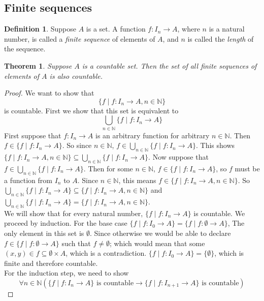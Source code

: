 \documentclass{report}
\newtheorem*{theorem}{Theorem}
\theoremstyle{definition}
\newtheorem*{definition}{Definition}
\begin{document}
\subsection{Finite sequences}
\begin{definition}
Suppose $A$ is a set. A function $f:I_n\to A$, where $n$ is a natural number, is called a \textit{finite sequence} of elements of $A$, and $n$ is called the \textit{length} of the sequence.
\end{definition}
\begin{theorem}
Suppose $A$ is a countable set. Then the set of all finite sequences of elements of $A$ is also countable.
\end{theorem}
\begin{proof}
We want to show that 
\begin{equation*}
\{f\mid f:I_n\to A,n\in\mathbb N\}
\end{equation*}
is countable. First we show that this set is equivalent to
\begin{equation*}
\bigcup_{n\in\mathbb N}\{f\mid f:I_n\to A\}
\end{equation*}
First suppose that $f:I_n\to A$ is an arbitrary function for arbitrary $n\in\mathbb N$. 
Then $f\in\{f\mid f:I_n\to A\}$. So since $n\in\mathbb N$, $f\in\bigcup_{n\in\mathbb N}\{f\mid f:I_n\to A\}$. This shows 
$\{f\mid f:I_n\to A,n\in\mathbb N\}\subseteq\bigcup_{n\in\mathbb N}\{f\mid f:I_n\to A\}$.
Now suppose that $f\in\bigcup_{n\in\mathbb N}\{f\mid f:I_n\to A\}$. Then for some $n\in\mathbb N$, $f\in\{f\mid f:I_n\to A\}$, so $f$ must be a function from $I_n$ to $A$. 
Since $n\in\mathbb N$, this means $f\in\{f\mid f:I_n\to A,n\in\mathbb N\}$. So
$\bigcup_{n\in\mathbb N}\{f\mid f:I_n\to A\}\subseteq\{f\mid f:I_n\to A,n\in\mathbb N\}$ and 
$\bigcup_{n\in\mathbb N}\{f\mid f:I_n\to A\}=\{f\mid f:I_n\to A,n\in\mathbb N\}$.\\
\indent We will show that for every natural number, $\{f\mid f:I_n\to A\}$ is countable. We proceed by induction. For the base case $\{f\mid f:I_0\to A\}=\{f\mid f:\emptyset\to A\}$,
The only element in this set is $\emptyset$. Since otherwise we would be able to declare $f\in\{f\mid f:\emptyset\to A\}$ such that $f\neq\emptyset$; which would mean that some 
$(x,y)\in f\subseteq\emptyset\times A$, which is a contradiction. $\{f\mid f:I_0\to A\}=\{\emptyset\}$, which is finite and therefore countable.\\
\indent For the induction step, we need to show
\begin{equation*}
\forall n\in\mathbb N(\{f\mid f:I_n\to A\}\text{ is countable}\to\{f\mid f:I_{n+1}\to A\}\text{ is countable})

\end{equation*}
\end{proof}
\end{document}
